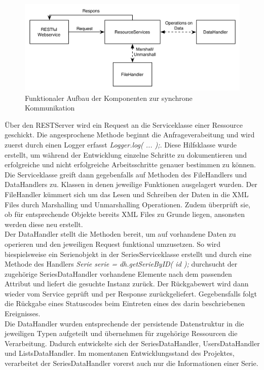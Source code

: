 \begin{figure}[h!]
\includegraphics[width=1\textwidth]{../images/aufbaurest.png}
\caption{Funktionaler Aufbau der Komponenten zur synchrone Kommunikation }
\label{RESTaufbau}
\end{figure}

Über den RESTServer wird ein Request an die Serviceklasse einer Ressource geschickt. Die angesprochene Methode beginnt die Anfrageverabeitung und wird zuerst durch einen Logger erfasst \textit{  Logger.log( ... );}. Diese Hilfsklasse wurde erstellt, um während der Entwicklung einzelne Schritte zu dokumentieren und erfolgreiche und nicht erfolgreiche Arbeitsschritte genauer bestimmen zu können. Die Serviceklasse greift dann gegebenfalls auf Methoden des FileHandlers und DataHandlers zu. Klassen in denen jeweilige Funktionen ausgelagert wurden. Der FileHandler kümmert sich um das Lesen und Schreiben der Daten in die XML Files durch Marshalling und Unmarshalling Operationen. Zudem überprüft sie, ob für entsprechende Objekte bereits XML Files zu Grunde liegen, ansonsten werden diese neu erstellt.\\
Der DataHandler stellt die Methoden bereit, um auf vorhandene Daten zu operieren und den jeweiligen Request funktional umzusetzen. So wird biespielsweise ein Serienobjekt in der SeriesServiceklasse erstellt und durch eine Methode des Handlers \textit{Serie serie = dh.getSerieByID( id );} durchsucht der zugehörige SeriesDataHandler  vorhandene Elemente nach dem passenden Attribut und liefert die gesuchte Instanz zurück. Der Rückgabewert wird dann wieder vom Service geprüft und per Response zurückgeliefert. Gegebensfalls folgt die Rückgabe eines Statuscodes beim Eintreten eines des darin beschriebenen Ereignisses.\\
Die DataHandler wurden entsprechende der persistende Datenstruktur in die jeweiligen Typen aufgeteilt und übernehmen für zugehörige Ressourcen die Verarbeitung. Dadurch entwickelte sich der SeriesDataHandler, UsersDataHandler und ListsDataHandler. Im momentanen Entwicklungsstand des Projektes, verarbeitet der SeriesDataHandler vorerst auch nur die Informationen einer Serie.

